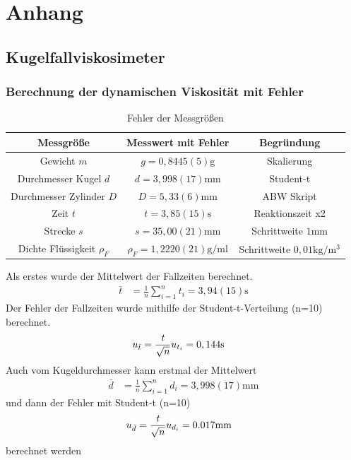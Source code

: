 \documentclass[11pt, a4paper]{article}
\begin{document}
    \section{Anhang}
    \subsection{Kugelfallviskosimeter}

    \subsubsection{Berechnung der dynamischen Viskosität mit Fehler} \label{sec:dynvisc}
    
    \begin{table}
       \begin{adjustwidth}{-5cm}{-5cm}
            \centering
            \begin{tabular}{c c c}
                Messgröße & Messwert mit Fehler & Begründung \\ \hline
                
                Gewicht $m$ & $g = 0,8445(5) \si{\gram}$ & Skalierung \\
                Durchmesser Kugel $d$ & $d = 3,998(17) \si{\milli\meter}$ & Student-t \\
                Durchmesser Zylinder $D$ & $D = 5,33(6) \si{\milli\meter}$ & ABW Skript \cite[Tabelle 6]{ABW} \\
                Zeit $t$ & $t = 3,85(15) \si{\second}$ & Reaktionszeit x2\\
                Strecke $s$ & $s = 35,00(21) \si{\milli\metre}$ & Schrittweite $1 \si{\milli\metre}$ \\
                Dichte Flüssigkeit $\rho_F$ & $\rho_F = 1,2220(21)  \si{\gram\per\milli\litre}$ & Schrittweite $0,01 \si{\kilogram\per\cubic\metre}$ \\

            \end{tabular}
        \end{adjustwidth}
        \label{tab:errors}
        \caption[]{Fehler der Messgrößen}
    \end{table}
    
    Als erstes wurde der Mittelwert der Fallzeiten berechnet.
    \begin{align}
        \bar{t} &= \frac{1}{n} \sum_{i=1}^{n} t_i = 3,94(15) \si{\second}
    \end{align}
    Der Fehler der Fallzeiten wurde mithilfe der Student-t-Verteilung (n=10) berechnet.
    \begin{align}
        u_{\bar{t}} &= \frac{{\it t}}{\sqrt{n}} u_{t_i} =  0,144 \si{\second}
    \end{align}
    Auch vom Kugeldurchmesser kann erstmal der Mittelwert
    \begin{align}
        \bar{d} &= \frac{1}{n} \sum_{i=1}^{n} d_i = 3,998(17) \si{\milli\metre}
    \end{align}
    und dann der Fehler mit Student-t (n=10)
    \begin{align}
        u_{\bar{d}} &= \frac{{\it t}}{\sqrt{n}} u_{d_i} = 0.017 \si{\milli\metre}
    \end{align}
    berechnet werden
\end{document}
